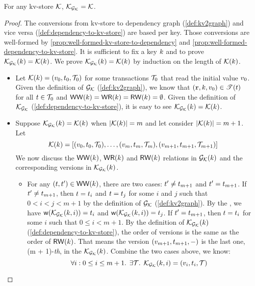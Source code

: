 \begin{proposition}
    \label{prop:bijection:mkvs-dgraph}
For any kv-store $\mathcal{K}$, $\mathcal{K}_{\mathcal{G}_{\mathcal{K}}} = \mathcal{K}$.
\end{proposition}
\begin{proof}
The conversions from kv-store to dependency graph (\cref{def:kv2graph}) and vice versa (\cref{def:dependency-to-kv-store}) are based per key.
Those conversions are well-formed by \cref{prop:well-formed-kv-store-to-dependency} and \cref{prop:well-formed-dependency-to-kv-store}.
It is sufficient to fix a key \( k \) and to prove \( \mathcal{K}_{\mathcal{G}_{\mathcal{K}}}(k) = \mathcal{K}(k) \).
We prove \( \mathcal{K}_{\mathcal{G}_{\mathcal{K}}}(k) = \mathcal{K}(k) \) by induction on the length of \( \mathcal{K}(k) \).

\begin{itemize}
    \item {}
Let \( \mathcal{K}(k) = (v_0, t_0, \mathcal{T}_0 ) \) for some transactions \( \mathcal{T}_0 \) that read the initial value \( v_0 \).
Given the definition of \( \mathcal{G}_{\mathcal{K}} \) (\cref{def:kv2graph}), we know that \( (\textnormal{\texttt r}, k, v_0 ) \in \mathscr{T}(t) \) for all \( t \in \mathcal{T}_0 \) and \( \mathsf{WW}(k) = \mathsf{WR}(k) = \mathsf{RW}(k) = \emptyset  \).
Given the definition of \( \mathcal{K}_{\mathcal{G}_{\mathcal{K}}}\) (\cref{def:dependency-to-kv-store}), it is easy to see \( \mathcal{K}_{\mathcal{G}_{\mathcal{K}}}(k) = \mathcal{K}(k) \).

    \item {}
Suppose \( \mathcal{K}_{\mathcal{G}_{\mathcal{K}}}(k) = \mathcal{K}(k) \) when \( |\mathcal{K}(k)| = m \) and let consider  \( |\mathcal{K}(k)| = m + 1 \).
Let 
\[
    \mathcal{K}(k) = \left[ (v_0, t_0, \mathcal{T}_0 ), \dots, (v_m, t_m, \mathcal{T}_m ), (v_{m+1}, t_{m+1}, \mathcal{T}_{m+1} )  \right] 
\]
We now discuss the \( \mathsf{WW}(k) \), \( \mathsf{WR}(k) \) and \( \mathsf{RW}(k) \) relations in \( \mathcal{G}_{\mathcal{K}}(k) \) and the corresponding versions in \( \mathcal{K}_{\mathcal{G}_{\mathcal{K}}}(k) \).
\begin{itemize}
    \item For any \( (t, t') \in \mathsf{WW}(k) \), there are two cases: \( t' \neq t_{m+1} \) and \( t' = t_{m+1} \).
    If \( t' \neq t_{m+1} \), then \( t = t_i \) and \( t = t_j \) for some \( i \) and \( j \) such that \( 0 < i < j < m + 1 \) by the definition of \( \mathcal{G}_{\mathcal{K}} \) (\cref{def:kv2graph}).
    By the \ih, we have \( \wtOf(\mkvs_{\Gr_\mkvs}(\key,i))  = \txid_i \) and \( \wtOf(\mkvs_{\Gr_\mkvs}(\key,i))  = \txid_j \).
    If \( t' = t_{m + 1} \), then \( t = t_i \) for some \( i \) such that \( 0 \leq i < m + 1 \).
    By the definition of  \( \mathcal{K}_{\mathcal{G}_{\mathcal{K}}}(k) \) (\cref{def:dependency-to-kv-store}), the order of versions is the same as the order of \( \mathsf{RW}(k) \).
    That means the version \( (v_{m+1}, t_{m+1}, - ) \) is the last one, \ie (m + 1)-\emph{th}, in the \( \mathcal{K}_{\mathcal{G}_{\mathcal{K}}}(k) \).
    Combine the two cases above, we know:
    \begin{equation}
        \label{equ:ww-back-to-ww}
        \forall i : 0 \leq i \leq m + 1 \ldotp \; \exists \mathcal{T} \ldotp \; \mathcal{K}_{\mathcal{G}_{\mathcal{K}}}(k, i) = (v_i, t_i, \mathcal{T})
    \end{equation}
    

\end{itemize}
\end{itemize}
\end{proof}
